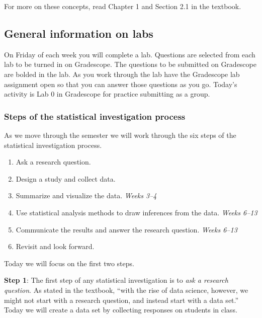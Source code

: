 \documentclass[
]{report}
\begin{document}
For more on these concepts, read Chapter 1 and Section 2.1 in the textbook.

\hypertarget{general-information-on-labs}{%
\subsection{General information on labs}\label{general-information-on-labs}}

On Friday of each week you will complete a lab. Questions are selected from each lab to be turned in on Gradescope. The questions to be submitted on Gradescope are bolded in the lab. As you work through the lab have the Gradescope lab assignment open so that you can answer those questions as you go. Today's activity is Lab 0 in Gradescope for practice submitting as a group.

\hypertarget{steps-of-the-statistical-investigation-process}{%
\subsubsection*{Steps of the statistical investigation process}\label{steps-of-the-statistical-investigation-process}}

As we move through the semester we will work through the six steps of the statistical investigation process.

\begin{enumerate}
\def\labelenumi{\arabic{enumi}.}
\item
  Ask a research question.
\item
  Design a study and collect data.
\item
  Summarize and visualize the data. \emph{Weeks 3--4}
\item
  Use statistical analysis methods to draw inferences from the data. \emph{Weeks 6--13}
\item
  Communicate the results and answer the research question. \emph{Weeks 6--13}
\item
  Revisit and look forward.
\end{enumerate}

Today we will focus on the first two steps.

\textbf{Step 1}: The first step of any statistical investigation is to \emph{ask a research question}. As stated in the textbook, ``with the rise of data science, however, we might not start with a research question, and instead start with a data set.'' Today we will create a data set by collecting responses on students in class.
\end{document}

